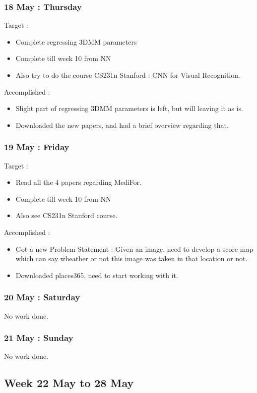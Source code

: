 \documentclass{article}
\begin{document}
\subsubsection{18 May : Thursday}
Target :
\begin{itemize}
\item Complete regressing 3DMM parameters
\item Complete till week 10 from NN
\item Also try to do the course CS231n Stanford : CNN for Visual Recognition. 
\end{itemize}
Accomplished :
\begin{itemize}
\item Slight part of regressing 3DMM parameters is left, but will leaving it as is.
\item Downloaded the new papers, and had a brief overview regarding that.
\end{itemize}

\subsubsection{19 May : Friday}
Target :
\begin{itemize}
\item Read all the  4 papers regarding MediFor.
\item Complete till week 10 from NN
\item Also see CS231n Stanford course.
\end{itemize}

Accomplished :
\begin{itemize}
\item Got a new Problem Statement :
  Given an image, need to develop a score map which can say wheather or not this image was taken in that location or not.
\item Downloaded places365, need to start working with it.
\end{itemize}

\subsubsection{20 May : Saturday}
No work done.

\subsubsection{21 May : Sunday}
No work done.

\subsection{Week 22 May to 28 May}
\end{document}
